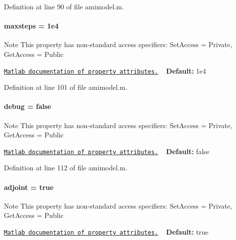 Definition at line 90 of file amimodel.\+m.

\hypertarget{classamimodel_ac37622882dacee1f11688d4941ccb45e}{}
\paragraph[{maxsteps}]{\setlength{\rightskip}{0pt plus 5cm}maxsteps = 1e4}\label{classamimodel_ac37622882dacee1f11688d4941ccb45e}
\begin{DoxyNote}{Note}
This property has non-\/standard access specifiers\+: {\ttfamily Set\+Access = Private, Get\+Access = Public} 

\href{http://www.mathworks.com/help/matlab/matlab_oop/property-attributes.html}{\tt Matlab documentation of property attributes.} ~\newline
{\bfseries Default\+:} 1e4 
\end{DoxyNote}


Definition at line 101 of file amimodel.\+m.

\hypertarget{classamimodel_a0514aabed091ee5e2f35766eb01eced6}{}
\paragraph[{debug}]{\setlength{\rightskip}{0pt plus 5cm}debug = false}\label{classamimodel_a0514aabed091ee5e2f35766eb01eced6}
\begin{DoxyNote}{Note}
This property has non-\/standard access specifiers\+: {\ttfamily Set\+Access = Private, Get\+Access = Public} 

\href{http://www.mathworks.com/help/matlab/matlab_oop/property-attributes.html}{\tt Matlab documentation of property attributes.} ~\newline
{\bfseries Default\+:} false 
\end{DoxyNote}


Definition at line 112 of file amimodel.\+m.

\hypertarget{classamimodel_ab6d500b41cf50693452415caca31d32e}{}
\paragraph[{adjoint}]{\setlength{\rightskip}{0pt plus 5cm}adjoint = true}\label{classamimodel_ab6d500b41cf50693452415caca31d32e}
\begin{DoxyNote}{Note}
This property has non-\/standard access specifiers\+: {\ttfamily Set\+Access = Private, Get\+Access = Public} 

\href{http://www.mathworks.com/help/matlab/matlab_oop/property-attributes.html}{\tt Matlab documentation of property attributes.} ~\newline
{\bfseries Default\+:} true 
\end{DoxyNote}


